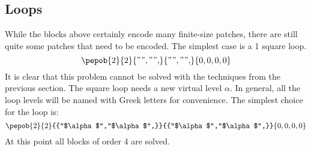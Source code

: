 \subsection{Loops}

While the blocks above certainly encode many finite-size patches, there are still quite some patches that need to be encoded. The simplest case is a 1 square loop.
\begin{equation}
  {\pepob{2}{2}{{"","",}}{{"","",}}{{0,0,0,0}}}
\end{equation}
It is clear that this problem cannot be solved with the techniques from the previous section. The square loop needs a new virtual level $\alpha$. In general, all the loop levels will be named with Greek letters for convenience. The simplest choice for the loop is:
\begin{equation}\label{tikzfig:plaquetter}
  {\pepob{2}{2}{{"$\alpha$","$\alpha$",}}{{"$\alpha$","$\alpha$",}}{{0,0,0,0}}}
\end{equation}
At this point all blocks of order 4 are solved.


